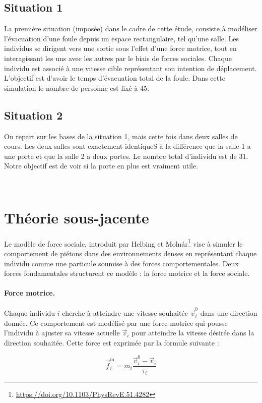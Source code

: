 \documentclass[a4paper,12pt]{article}
\begin{document}
\subsection{Situation 1}
\indent La première situation (imposée) dans le cadre de cette étude, consiste à modéliser l’évacuation d’une foule depuis un espace rectangulaire, tel qu’une salle. Les individus se dirigent vers une sortie sous l'effet d'une force motrice, tout en interagissant les uns avec les autres par le biais de forces sociales. Chaque individu est associé à une vitesse cible représentant son intention de déplacement. L'objectif est d'avoir le temps d'évacuation total de la foule. Dans cette simulation le nombre de personne est fixé à 45.

\subsection{Situation 2}
\indent On repart sur les bases de la situation 1, mais cette fois dans deux salles de cours. Les deux salles sont exactement identiqueS à la différence que la salle 1 a une porte et que la salle 2 a deux portes. Le nombre total d'individu est de 31. Notre objectif est de voir si la porte en plus est vraiment utile.

\
\section{Théorie sous-jacente}

Le modèle de force sociale, introduit par Helbing et Molnár\footnote{\url{https://doi.org/10.1103/PhysRevE.51.4282}} vise à simuler le comportement de piétons dans des environnements denses en représentant chaque individu comme une particule soumise à des forces comportementales. Deux forces fondamentales structurent ce modèle : la force motrice et la force sociale.

\paragraph{Force motrice.}
Chaque individu $i$ cherche à atteindre une vitesse souhaitée $\vec{v}_i^0$ dans une direction donnée. Ce comportement est modélisé par une force motrice qui pousse l'individu à ajuster sa vitesse actuelle $\vec{v}_i$ pour atteindre la vitesse désirée dans la direction souhaitée. Cette force est exprimée par la formule suivante :

\begin{equation}
\label{eq:force_motrice}
\vec{f}_i^{\text{m}} = m_i \frac{\vec{v}_i^0 - \vec{v}_i}{\tau_i}
\end{equation}
\end{document}
